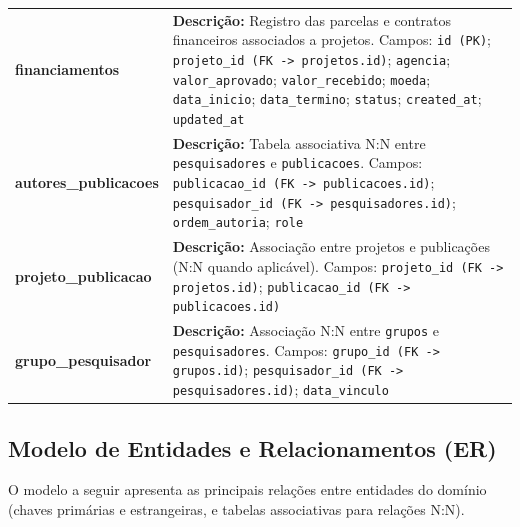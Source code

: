 \documentclass[12pt,a4paper]{article}
\begin{document}
\begin{longtable}{p{4cm} p{10cm}}
\textbf{financiamentos} & \textbf{Descrição:} Registro das parcelas e contratos financeiros associados a projetos. Campos: \texttt{id (PK)}; \texttt{projeto\_id (FK -> projetos.id)}; \texttt{agencia}; \texttt{valor\_aprovado}; \texttt{valor\_recebido}; \texttt{moeda}; \texttt{data\_inicio}; \texttt{data\_termino}; \texttt{status}; \texttt{created\_at}; \texttt{updated\_at} \\
\textbf{autores\_publicacoes} & \textbf{Descrição:} Tabela associativa N:N entre \texttt{pesquisadores} e \texttt{publicacoes}. Campos: \texttt{publicacao\_id (FK -> publicacoes.id)}; \texttt{pesquisador\_id (FK -> pesquisadores.id)}; \texttt{ordem\_autoria}; \texttt{role} \\
\textbf{projeto\_publicacao} & \textbf{Descrição:} Associação entre projetos e publicações (N:N quando aplicável). Campos: \texttt{projeto\_id (FK -> projetos.id)}; \texttt{publicacao\_id (FK -> publicacoes.id)} \\
\textbf{grupo\_pesquisador} & \textbf{Descrição:} Associação N:N entre \texttt{grupos} e \texttt{pesquisadores}. Campos: \texttt{grupo\_id (FK -> grupos.id)}; \texttt{pesquisador\_id (FK -> pesquisadores.id)}; \texttt{data\_vinculo} \\
\end{longtable}

\subsection{Modelo de Entidades e Relacionamentos (ER)}
O modelo a seguir apresenta as principais relações entre entidades do domínio (chaves primárias e estrangeiras, e tabelas associativas para relações N:N).
\end{document}

